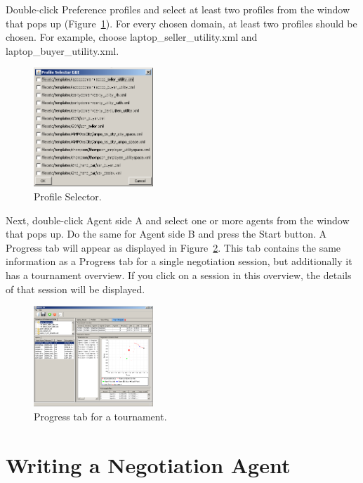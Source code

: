 \documentclass[]{article}
\begin{document}
Double-click Preference profiles and select at least two profiles from the window that pops up (Figure~\ref{Fig:profile}). For every chosen domain, at least two profiles should be chosen. For example, choose laptop\_seller\_utility.xml and laptop\_buyer\_utility.xml.

\begin{figure}[htb]
	\centering
	\includegraphics[width=0.4\textwidth]{media/image17.png}
\caption{Profile Selector.}\label{Fig:profile}
\end{figure}

Next, double-click Agent side A and select one or more agents from the window that pops up. Do the same for Agent side B and press the Start button. A Progress tab will appear as displayed in Figure~\ref{Fig:tournament progress}. This tab contains the same information as a Progress tab for a single negotiation session, but additionally it has a tournament overview. If you click on a session in this overview, the details of that session will be displayed.

\begin{figure}[htb]
	\centering
	\includegraphics[width=0.4\textwidth]{media/image18.png}
\caption{Progress tab for a tournament.}\label{Fig:tournament progress}
\end{figure}

\section{Writing a Negotiation Agent}
\end{document}
